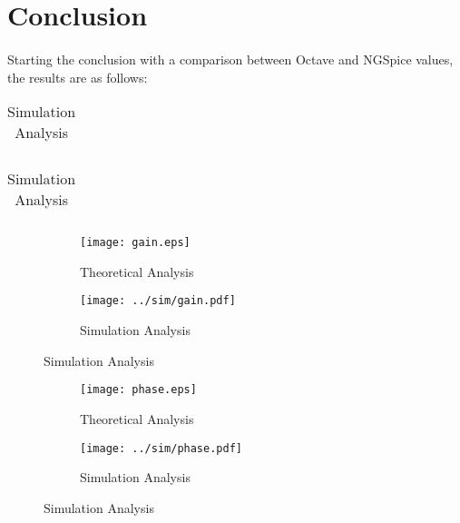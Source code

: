 \newpage{}

\section{Conclusion}
\label{sec:conclusion}
\paragraph{}
\par Starting the conclusion with a comparison between Octave and NGSpice values, the results are as follows:
\begin{table}[H]
	\begin{minipage}{.5\linewidth}
		\centering
		\begin{tabular}{|c|c|}
		\hline
		
		\end{tabular}
		\caption{Theoretical Analysis}
		\label{ta}
	\end{minipage}
	\begin{minipage}{.5\linewidth}
		\centering
		\begin{tabular}{|c|c|}
		\hline
		
    		
    		
	\end{tabular}
		\caption{Simulation Analysis}
		\label{sa}
	\end{minipage} 
\end{table}


\begin{figure}[H]
\centering
\begin{subfigure}{.5\textwidth}
  \centering
  \texttt{[image: gain.eps]}
  \caption{Theoretical Analysis}
  \label{fig:sim4}
\end{subfigure}%
\begin{subfigure}{.5\textwidth}
  \centering
  \texttt{[image: ../sim/gain.pdf]}
  \caption{Simulation Analysis}
  \label{fig:sim5}
\end{subfigure}
\end{figure}





\begin{figure}[H]
\centering
\begin{subfigure}{.5\textwidth}
  \centering
  \texttt{[image: phase.eps]}
  \caption{Theoretical Analysis}
  \label{fig:sim4}
\end{subfigure}%
\begin{subfigure}{.5\textwidth}
  \centering
  \texttt{[image: ../sim/phase.pdf]}
  \caption{Simulation Analysis}
  \label{fig:sim5}
\end{subfigure}
\end{figure}
		

